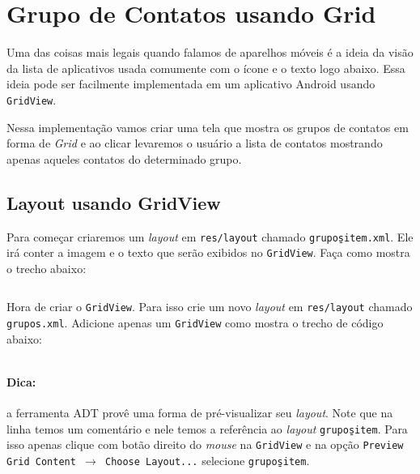 \section{Grupo de Contatos usando Grid}

Uma das coisas mais legais quando falamos de aparelhos móveis é a ideia da visão da lista de aplicativos
usada comumente com o ícone e o texto logo abaixo. Essa ideia pode ser facilmente implementada em
um aplicativo Android usando \texttt{GridView}.

Nessa implementação vamos criar uma tela que mostra os grupos de contatos em forma de \textit{Grid}
e ao clicar levaremos o usuário a lista de contatos mostrando apenas aqueles contatos do determinado
grupo.

\subsection{Layout usando GridView}

Para começar criaremos um \textit{layout} em \texttt{res/layout} chamado \texttt{grupos\b{ }item.xml}.
Ele irá conter a imagem e o texto que serão exibidos no \texttt{GridView}. Faça como mostra o trecho abaixo:

\begin{listing}[H]
  \inputminted[linenos=true,frame=bottomline,tabsize=3]{ xml }{ source/grupos_item-1.xml }
  \caption{Item do Layout de Grupos [res/layout/grupos\b{ }item.xml]}
\end{listing}

Hora de criar o \texttt{GridView}. Para isso crie um novo \textit{layout} em \texttt{res/layout} chamado
\texttt{grupos.xml}. Adicione apenas um \texttt{GridView} como mostra o trecho de código abaixo:

\begin{listing}[H]
  \inputminted[linenos=true,frame=bottomline,tabsize=3]{ xml }{ source/grupos-1.xml }
  \caption{Layout de Grupos [res/layout/grupos.xml]}
\end{listing}

\paragraph{Dica:} a ferramenta ADT provê uma forma de pré-visualizar seu \textit{layout}. Note que
na linha  temos um comentário e nele temos a referência ao \textit{layout}
\texttt{grupos\b{ }item}. Para isso apenas clique com botão direito do \textit{mouse} na \texttt{GridView}
e na opção \texttt{Preview Grid Content $\rightarrow$ Choose Layout...} selecione \texttt{grupos\b{ }item}.

